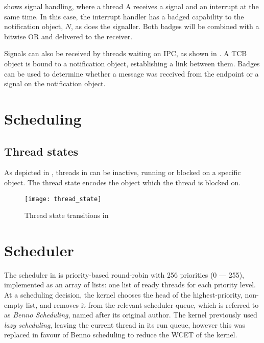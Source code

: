  shows signal handling, where a thread A receives a signal and an interrupt at the
same time. In this case, the interrupt handler has a badged capability to the notification object,
$N$, as does the signaller. Both badges will be combined with a bitwise OR and delivered to the
receiver.

Signals can also be received by threads waiting on \gls{IPC}, as shown in . A
\gls{TCB} object is bound to a notification object, establishing a link between them. Badges can be
used to determine whether a message was received from the endpoint or a signal on the notification object.

\section{Scheduling}





\subsection{Thread states}

As depicted in , threads in \selfour can be inactive, running or blocked on a
specific object. The thread state encodes the object which the thread is blocked on. 

\begin{figure}[h!tb]
    \centering
    \texttt{[image: thread\_state]}
    \caption{Thread state transitions in \selfour}
    \label{f:thread_state}
\end{figure}


\section{Scheduler}

The scheduler in \selfour is priority-based round-robin with 256 priorities (0 --- 255), implemented as an array of lists: one list of ready threads for each priority level. 
At a scheduling decision, the kernel chooses the head of the highest-priority, non-empty list, and
removes it from the relevant scheduler queue, which is referred to as \emph{Benno Scheduling}, named
after its original author.
The kernel previously used \emph{lazy scheduling}, leaving the current thread in its run queue, however this was replaced in favour of Benno scheduling to reduce the WCET of the kernel. 

